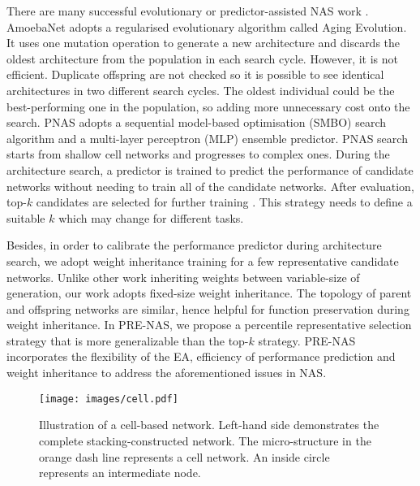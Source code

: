 \documentclass[sigconf]{acmart}
\begin{document}
There are many successful evolutionary or predictor-assisted NAS work \cite{Ref:07,Ref:08,Ref:27,Ref:36,Ref:37,Ref:40,Ref:41,Ref:51}. AmoebaNet \cite{Ref:08} adopts a regularised evolutionary algorithm called Aging Evolution.  It uses one mutation operation to generate a new architecture and discards the oldest architecture from the population in each search cycle.  However, it is not efficient.  Duplicate offspring are not checked so it is possible to see identical architectures in two different search cycles.  The oldest individual could be the best-performing one in the population, so adding more unnecessary cost onto the search.  PNAS \cite{Ref:40} adopts a sequential model-based optimisation (SMBO) search algorithm and a multi-layer perceptron (MLP) ensemble predictor.  PNAS search starts from shallow cell networks and progresses to complex ones.  During the architecture search, a predictor is trained to predict the performance of candidate networks without needing to train all of the candidate networks.  After evaluation, top-$k$ candidates are selected for further training \cite{Ref:40}.  This strategy needs to define a suitable $k$ which may change for different tasks.  

Besides, in order to calibrate the performance predictor during architecture search, we adopt weight inheritance training for a few representative candidate networks.  Unlike other work \cite{Ref:55,Ref:36} inheriting weights between variable-size of generation, our work adopts fixed-size weight inheritance.  The topology of parent and offspring networks are similar, hence helpful for function preservation during weight inheritance.
In PRE-NAS, we propose a percentile representative selection strategy that is more generalizable than the top-$k$ strategy.  PRE-NAS incorporates the flexibility of the EA, efficiency of performance prediction and weight inheritance to address the aforementioned issues in NAS. 



 \begin{figure}[!t]
    \begin{center}
  	\texttt{[image: images/cell.pdf]}
  	\caption{Illustration of a cell-based network. Left-hand side demonstrates the complete stacking-constructed network. The micro-structure in the orange dash line represents a cell network. An inside circle represents an intermediate node.}
  	\label{cell}
  	\end{center}
\end{figure} 
\end{document}
